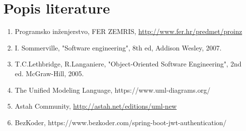 \chapter*{Popis literature}
	 			
		\begin{enumerate}
			
			
			\item  Programsko inženjerstvo, FER ZEMRIS, \url{http://www.fer.hr/predmet/proinz}
			
			\item  I. Sommerville, "Software engineering", 8th ed, Addison Wesley, 2007.
			
			\item  T.C.Lethbridge, R.Langaniere, "Object-Oriented Software Engineering", 2nd ed. McGraw-Hill, 2005.
			
			\item  The Unified Modeling Language, https://www.uml-diagrams.org/
			
			
			\item  Astah Community, \url{http://astah.net/editions/uml-new}
			
			\item BezKoder, https://www.bezkoder.com/spring-boot-jwt-authentication/
			
		\end{enumerate}
		
		 